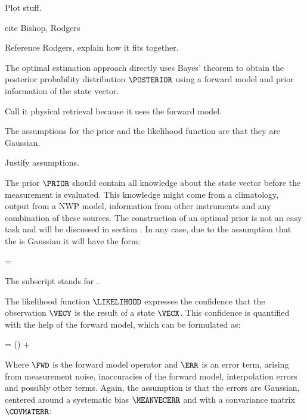     \stopsubsection

    
    Plot stuff.

    cite Bishop, Rodgers

\stopsection


\startsection[title={Optimal Estimation},reference=ch:optimalestimation]

    Reference Rodgers, explain how it fits together.

    The optimal estimation approach directly uses Bayes' theorem
     to obtain the posterior probability distribution
    $\POSTERIOR$ using a forward model and prior information of the state
    vector.

    Call it physical retrieval because it uses the forward model.

    The assumptions for the prior {\PDF} and the likelihood function
    are that they are Gaussian.

    Justify assumptions.

    The prior $\PRIOR$ should contain all knowledge about the state vector
    before the measurement is evaluated. This knowledge might come from
    a climatology, output from a NWP model, information from other instruments
    and any combination of these sources. The construction of an optimal prior
    is not an easy task and will be discussed in section
    . In any case, due to the assumption that the
    {\PDF} is Gaussian it will have the form:

    \startformula
        \PRIOR = \GAUSS{\VECX}{\MEANVECA}{\COVMATA}
    \stopformula

    The subscript stands for .

    The likelihood function $\LIKELIHOOD$ expresses the confidence that the
    observation $\VECY$ is the result of a state $\VECX$. This confidence is
    quantified with the help of the forward model, which can be formulated as:

    \startformula
        \VECY = \FWD(\VECX) + \ERR
    \stopformula

    Where $\FWD$ is the forward model operator and $\ERR$ is an error term,
    arising from measurement noise, inaccuracies of the forward model,
    interpolation errors and possibly other terms. Again, the assumption is
    that the errors are Gaussian, centered around a systematic bias
    $\MEANVECERR$ and with a convariance matrix $\COVMATERR$:


